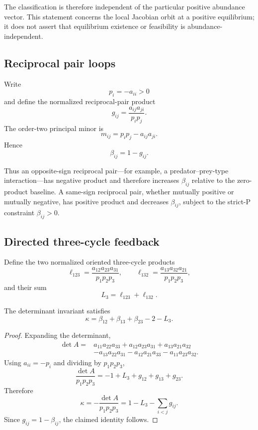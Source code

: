 The classification is therefore independent of the particular positive abundance vector. This statement concerns the local Jacobian orbit at a positive equilibrium; it does not assert that equilibrium existence or feasibility is abundance-independent.

\subsection{Reciprocal pair loops}

Write
\[
p_i=-a_{ii}>0
\]
and define the normalized reciprocal-pair product
\[
g_{ij}
=
\frac{a_{ij}a_{ji}}{p_ip_j}.
\]
The order-two principal minor is
\[
m_{ij}
=
p_ip_j-a_{ij}a_{ji}.
\]
Hence
\[
\boxed{
\beta_{ij}
=
1-g_{ij}.
}
\]

Thus an opposite-sign reciprocal pair---for example, a predator--prey-type interaction---has negative product and therefore increases \(\beta_{ij}\) relative to the zero-product baseline. A same-sign reciprocal pair, whether mutually positive or mutually negative, has positive product and decreases \(\beta_{ij}\), subject to the strict-P constraint \(\beta_{ij}>0\).

\subsection{Directed three-cycle feedback}

Define the two normalized oriented three-cycle products
\[
\ell_{123}
=
\frac{a_{12}a_{23}a_{31}}{p_1p_2p_3},
\qquad
\ell_{132}
=
\frac{a_{13}a_{32}a_{21}}{p_1p_2p_3},
\]
and their sum
\[
L_3
=
\ell_{123}+\ell_{132}.
\]

\begin{proposition}
\label{prop:loop-identity}
The determinant invariant satisfies
\[
\boxed{
\kappa
=
\beta_{12}+\beta_{13}+\beta_{23}-2-L_3.
}
\]
\end{proposition}

\begin{proof}
Expanding the determinant,
\[
\begin{aligned}
\det A
={}&
a_{11}a_{22}a_{33}
+a_{12}a_{23}a_{31}
+a_{13}a_{21}a_{32}\\
&-
a_{13}a_{22}a_{31}
-a_{12}a_{21}a_{33}
-a_{11}a_{23}a_{32}.
\end{aligned}
\]
Using \(a_{ii}=-p_i\) and dividing by \(p_1p_2p_3\),
\[
\frac{\det A}{p_1p_2p_3}
=
-1+L_3+g_{12}+g_{13}+g_{23}.
\]
Therefore
\[
\kappa
=
-\frac{\det A}{p_1p_2p_3}
=
1-L_3-\sum_{i<j}g_{ij}.
\]
Since \(g_{ij}=1-\beta_{ij}\), the claimed identity follows.
\end{proof}

